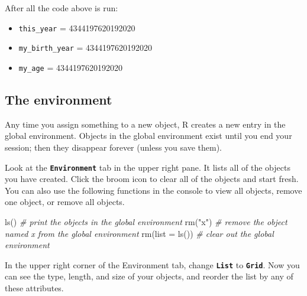 \documentclass[
  oneside]{book}
\newenvironment{Shaded}{\begin{snugshade}}{\end{snugshade}}
\newcommand{\AttributeTok}[1]{\textcolor[rgb]{0.77,0.63,0.00}{#1}}
\newcommand{\CommentTok}[1]{\textcolor[rgb]{0.56,0.35,0.01}{\textit{#1}}}
\newcommand{\FunctionTok}[1]{\textcolor[rgb]{0.00,0.00,0.00}{#1}}
\newcommand{\NormalTok}[1]{#1}
\newcommand{\StringTok}[1]{\textcolor[rgb]{0.31,0.60,0.02}{#1}}
\providecommand{\tightlist}{%
  \setlength{\itemsep}{0pt}\setlength{\parskip}{0pt}}
\begin{document}
\begin{try}

After all the code above is run:

\begin{itemize}
\tightlist
\item
  \texttt{this\_year} = 4344197620192020
\item
  \texttt{my\_birth\_year} = 4344197620192020
\item
  \texttt{my\_age} = 4344197620192020
\end{itemize}

\end{try}

\hypertarget{the-environment}{%
\subsection{The environment}\label{the-environment}}

Any time you assign something to a new object, R creates a new entry in the global environment. Objects in the global environment exist until you end your session; then they disappear forever (unless you save them).

Look at the \textbf{\texttt{Environment}} tab in the upper right pane. It lists all of the objects you have created. Click the broom icon to clear all of the objects and start fresh. You can also use the following functions in the console to view all objects, remove one object, or remove all objects.

\begin{Shaded}
\begin{Highlighting}[]
\FunctionTok{ls}\NormalTok{()            }\CommentTok{\# print the objects in the global environment}
\FunctionTok{rm}\NormalTok{(}\StringTok{"x"}\NormalTok{)         }\CommentTok{\# remove the object named x from the global environment}
\FunctionTok{rm}\NormalTok{(}\AttributeTok{list =} \FunctionTok{ls}\NormalTok{()) }\CommentTok{\# clear out the global environment}
\end{Highlighting}
\end{Shaded}

\begin{info}
In the upper right corner of the Environment tab, change \textbf{\texttt{List}} to \textbf{\texttt{Grid}}. Now you can see the type, length, and size of your objects, and reorder the list by any of these attributes.

\end{info}
\end{document}
